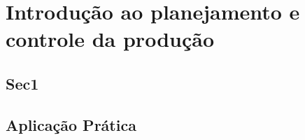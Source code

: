 \chapter{Introdução ao planejamento e controle da produção} 
\label{chap:introducao_ao_planejamento} 

\section{Sec1} 
\label{sec:introducao_ao_planejamento_sec1} 
 
\section{Aplicação Prática} 
\label{sec:introducao_ao_planejamento_aplicacao}

